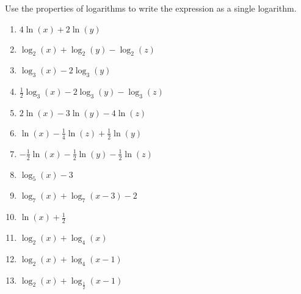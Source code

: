 \documentclass{ximera}
\author{Carl Stitz \and Jeff Zeager \and Bart Snapp \and Matthew Carr}
\begin{document}
\begin{exercise}






Use the properties of logarithms to write the expression as a single
logarithm. 

\begin{enumerate}
	\item $4\ln(x) + 2\ln(y)$%
	
	\item $\log_{2}(x) + \log_{2}(y) - \log_{2}(z)$%
	
	\item $\log_{3}(x) - 2 \log_{3}(y)$%
	
	\item $\frac{1}{2}\log_{3}(x) - 2\log_{3}(y) - \log_{3}(z)$%
	
	\item $2 \ln(x) -3 \ln(y) - 4\ln(z)$%
	
	\item $\ln(x) - \frac{1}{4} \ln(z) + \frac{1}{2} \ln(y)$%
	
	\item $-\frac{1}{2} \ln(x) - \frac{1}{2}\ln(y) - \frac{1}{2} \ln(z)$%
	
	\item $\log_{5}(x) - 3$%
	
	\item $\log_{7}(x) + \log_{7}(x - 3) - 2$%
	
	\item $\ln(x) + \frac{1}{2}$%
	
	\item $\log_{2}(x) + \log_{4}(x)$%
	
	\item $\log_{2}(x) + \log_{4}(x-1)$%
	
	\item $\log_{2}(x) + \log_{\frac{1}{2}}(x - 1)$%
\end{enumerate}

\end{exercise}
\end{document}
